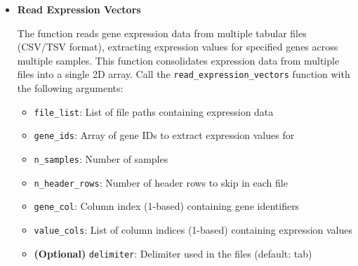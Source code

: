 \begin{enumerate}
\begin{itemize}
                  \begin{lstlisting}[language=Python, caption={Python Read Gene IDs from TSV File}]
gene_ids = read_gene_ids_from_tsv_file(filename, n_genes,
                            gene_ids_len, n_header_rows, gene_col)
                  \end{lstlisting}
                  
            \item \textbf{Read Expression Vectors}
                  
                  The function reads gene expression data from multiple tabular files (CSV/TSV
                  format), extracting expression values for specified genes across
                  multiple samples. This function consolidates expression data from multiple
                  files into a single 2D array. Call the \texttt{read\_expression\_vectors}
                  function with the following arguments:
                  
                  \begin{itemize}
                    \item \texttt{file\_list}: List of file paths containing expression data
                          
                    \item \texttt{gene\_ids}: Array of gene IDs to extract expression values
                          for
                          
                    \item \texttt{n\_samples}: Number of samples
                          
                    \item \texttt{n\_header\_rows}: Number of header rows to skip in each
                          file
                          
                    \item \texttt{gene\_col}: Column index (1-based) containing gene identifiers
                          
                    \item \texttt{value\_cols}: List of column indices (1-based) containing
                          expression values
                          
                    \item \textbf{(Optional)} \texttt{delimiter}: Delimiter used in the
                          files (default: tab)
                  \end{itemize}
                  

\end{itemize}
\end{enumerate}
